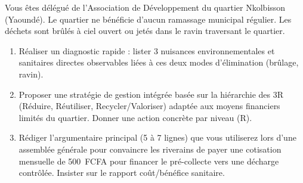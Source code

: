 \documentclass[11pt]{article}
\begin{document}
\begin{exercice}
Vous êtes délégué de l'Association de Développement du quartier Nkolbisson (Yaoundé). Le quartier ne bénéficie d'aucun ramassage municipal régulier. Les déchets sont brûlés à ciel ouvert ou jetés dans le ravin traversant le quartier.

\begin{enumerate}
    \item Réaliser un diagnostic rapide : lister 3 nuisances environnementales et sanitaires directes observables liées à ces deux modes d'élimination (brûlage, ravin).
    \item Proposer une stratégie de gestion intégrée basée sur la hiérarchie des 3R (Réduire, Réutiliser, Recycler/Valoriser) adaptée aux moyens financiers limités du quartier. Donner une action concrète par niveau (R).
    \item Rédiger l'argumentaire principal (5 à 7 lignes) que vous utiliserez lors d'une assemblée générale pour convaincre les riverains de payer une cotisation mensuelle de \SI{500}{FCFA} pour financer le pré-collecte vers une décharge contrôlée. Insister sur le rapport coût/bénéfice sanitaire.
\end{enumerate}
\end{exercice}
\end{document}
